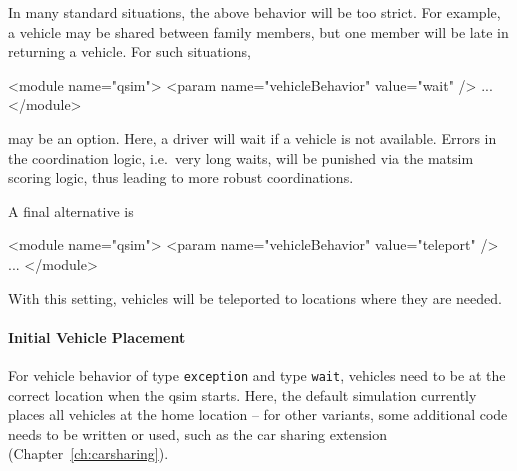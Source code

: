 In many standard situations, the above behavior will be too strict.  For example, a vehicle may be shared between family members, but one member will be late in returning a vehicle.  For such situations, 
\begin{xml}
<module name="qsim">
   <param name="vehicleBehavior" value="wait" />
   ...
</module>
\end{xml}
may be an option.  Here, a driver will wait if a vehicle is not available.  Errors in the coordination logic, i.e.\ very long waits, will be punished via the \gls{matsim} scoring logic,  thus leading to more robust coordinations.

A final alternative is
\begin{xml}
<module name="qsim">
   <param name="vehicleBehavior" value="teleport" />
   ...
</module>
\end{xml}
With this setting, vehicles will be teleported to locations where they are needed.

\paragraph{Initial Vehicle Placement}

For vehicle behavior of type \lstinline{exception} and type \lstinline{wait}, vehicles need to be at the correct location when the \gls{qsim} starts.  Here, the default simulation currently places all vehicles at the home location -- for other variants, some additional code needs to be written or used, such as the car sharing extension (Chapter~\ref{ch:carsharing}).







